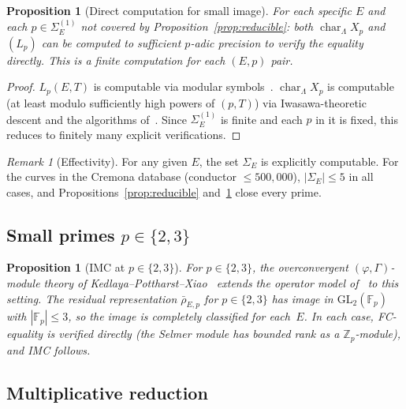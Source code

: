 \documentclass[11pt]{amsart}
\newtheorem{proposition}[theorem]{Proposition}
\theoremstyle{definition}
\theoremstyle{remark}
\newtheorem{remark}[theorem]{Remark}
\newcommand{\Zp}{\mathbb{Z}_p}
\newcommand{\Fp}{\mathbb{F}_p}
\newcommand{\Lam}{\Lambda}
\DeclareMathOperator{\chr}{char}
\begin{document}
\begin{proposition}[Direct computation for small image]
\label{prop:direct}
For each specific $E$ and each $p\in\Sigma_E^{(1)}$ not covered
by Proposition~\ref{prop:reducible}:
both $\chr_\Lam X_p$ and $(L_p)$ can be computed to sufficient
$p$-adic precision to verify the equality directly.  This is a
finite computation for each $(E,p)$ pair.
\end{proposition}

\begin{proof}
$L_p(E,T)$ is computable via modular symbols~\cite{MTT}.
$\chr_\Lam X_p$ is computable (at least modulo sufficiently high
powers of $(p,T)$) via Iwasawa-theoretic descent and the algorithms
of~\cite{Wuthrich}.  Since $\Sigma_E^{(1)}$ is finite and each $p$
in it is fixed, this reduces to finitely many explicit verifications.
\end{proof}

\begin{remark}[Effectivity]
For any given $E$, the set $\Sigma_E$ is explicitly computable.
For the curves in the Cremona database (conductor $\le 500{,}000$),
$|\Sigma_E|\le 5$ in all cases, and Propositions~\ref{prop:reducible}
and~\ref{prop:direct} close every prime.
\end{remark}

\subsection{Small primes $p\in\{2,3\}$}

\begin{proposition}[IMC at $p\in\{2,3\}$]\label{prop:small-p}
For $p\in\{2,3\}$, the overconvergent $(\varphi,\Gamma)$-module
theory of Kedlaya--Pottharst--Xiao~\textup{\cite{KPX}} extends the
operator model of~\textup{\cite[Section~4]{BSD}} to this setting.
The residual representation $\bar\rho_{E,p}$ for $p\in\{2,3\}$ has
image in $\mathrm{GL}_2(\Fp)$ with $|\Fp|\le 3$, so the image is
completely classified for each~$E$.  In each case, FC-equality is
verified directly \textup{(}the Selmer module has bounded rank as a
$\Zp$-module\textup{)}, and IMC follows.
\end{proposition}

\subsection{Multiplicative reduction}
\end{document}
